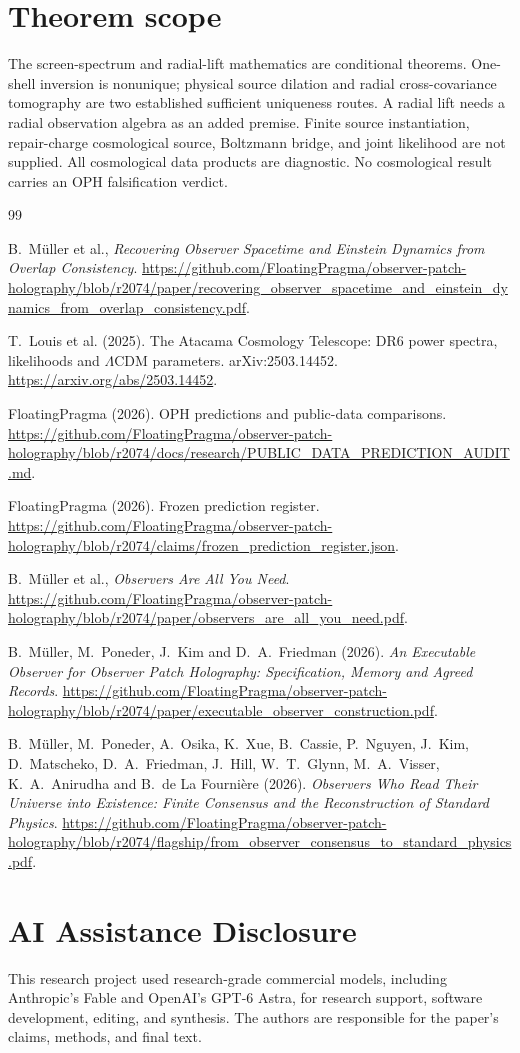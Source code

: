 \documentclass[11pt]{article}
\begin{document}
\section{Theorem scope}

The screen-spectrum and radial-lift mathematics are conditional theorems.
One-shell inversion is nonunique; physical source dilation and radial
cross-covariance tomography are two established sufficient uniqueness routes.
A radial lift needs a radial observation algebra as an added premise.
Finite source instantiation, repair-charge cosmological source, Boltzmann
bridge, and joint likelihood are not supplied. All cosmological
data products are diagnostic. No cosmological result carries an OPH
falsification verdict.

\begin{thebibliography}{99}

B.~M\"uller et al., \emph{Recovering Observer Spacetime and Einstein
Dynamics from Overlap Consistency}.
\url{https://github.com/FloatingPragma/observer-patch-holography/blob/r2074/paper/recovering_observer_spacetime_and_einstein_dynamics_from_overlap_consistency.pdf}.

T.~Louis et al. (2025). The Atacama Cosmology Telescope: DR6 power spectra,
likelihoods and \(\Lambda\)CDM parameters. arXiv:2503.14452.
\url{https://arxiv.org/abs/2503.14452}.

FloatingPragma (2026). OPH predictions and public-data comparisons.
\url{https://github.com/FloatingPragma/observer-patch-holography/blob/r2074/docs/research/PUBLIC_DATA_PREDICTION_AUDIT.md}.

FloatingPragma (2026). Frozen prediction register.
\url{https://github.com/FloatingPragma/observer-patch-holography/blob/r2074/claims/frozen_prediction_register.json}.

B.~M\"uller et al., \emph{Observers Are All You Need}.
\url{https://github.com/FloatingPragma/observer-patch-holography/blob/r2074/paper/observers_are_all_you_need.pdf}.

B.~M\"uller, M.~Poneder, J.~Kim and D.~A.~Friedman (2026). \emph{An Executable
Observer for Observer Patch Holography: Specification, Memory and Agreed
Records}.
\url{https://github.com/FloatingPragma/observer-patch-holography/blob/r2074/paper/executable_observer_construction.pdf}.

B.~M\"uller, M.~Poneder, A.~Osika, K.~Xue, B.~Cassie, P.~Nguyen, J.~Kim,
D.~Matscheko, D.~A.~Friedman, J.~Hill, W.~T.~Glynn, M.~A.~Visser,
K.~A.~Anirudha and B.~de La Fourni\`ere (2026). \emph{Observers Who Read Their
Universe into Existence: Finite Consensus and the Reconstruction of Standard
Physics}.
\url{https://github.com/FloatingPragma/observer-patch-holography/blob/r2074/flagship/from_observer_consensus_to_standard_physics.pdf}.

\end{thebibliography}

\section*{AI Assistance Disclosure}
This research project used research-grade commercial models, including
Anthropic's Fable and OpenAI's GPT-6 Astra, for research support, software
development, editing, and synthesis. The authors are responsible for the
paper's claims, methods, and final text.
\end{document}

